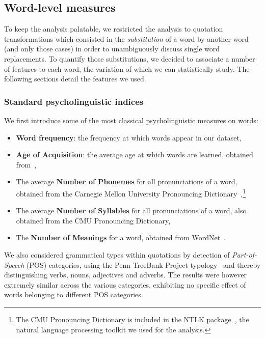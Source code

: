 \subsection{Word-level measures}

To keep the analysis palatable, we restricted the analysis to quotation transformations which consisted in the \emph{substitution} of a word by another word (and only those cases) in order to unambiguously discuss single word replacements. 
To quantify those substitutions, we decided to associate a number of features to each word, the variation of which we can statistically study.
The following sections detail the features we used.

\subsubsection{Standard psycholinguistic indices}

We first introduce some of the most classical psycholinguistic measures on words:


\begin{itemize}
    \item \textbf{Word frequency}: the frequency at which words appear in our dataset, 
    \item \textbf{Age of Acquisition}: the average age at which words are learned, obtained from~\citet{kuperman12},
    \item The average \textbf{Number of Phonemes} for all pronunciations of a word, obtained from the Carnegie Mellon University Pronouncing Dictionary~\citep{Weide98},\footnote{The CMU Pronouncing Dictionary is included in the NTLK package~\citep{Bird09}, the natural language processing toolkit we used for the analysis.}
    \item The average \textbf{Number of Syllables} for all pronunciations of a word, also obtained from the CMU Pronouncing Dictionary,
    \item The \textbf{Number of Meanings} for a word, obtained from WordNet~\citep{WordNet10}. 
\end{itemize}

We also considered grammatical types within quotations by detection of \emph{Part-of-Speech} (POS) categories, using the Penn TreeBank Project typology~\citep{Santorini90} and thereby distinguishing verbs, nouns, adjectives and adverbs.
The results were however extremely similar across the various categories, exhibiting no specific effect of words belonging to different POS categories.

